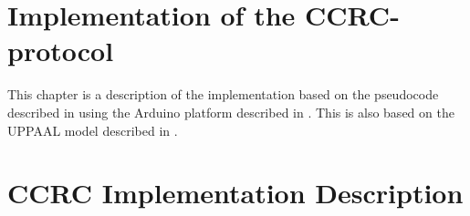 \section{Implementation of the CCRC-protocol}
This chapter is a description of the implementation based on the pseudocode described in  using the Arduino platform described in . 
This is also based on the UPPAAL model described in .
\section{CCRC Implementation Description}


